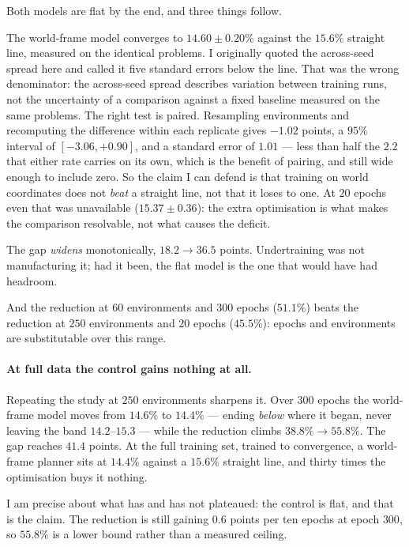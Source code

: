 \documentclass[11pt,a4paper]{article}
\begin{document}
Both models are flat by the end, and three things follow.

The world-frame model converges to $14.60 \pm 0.20\%$ against the $15.6\%$
straight line, measured on the identical problems. I originally quoted the
across-seed spread here and called it five standard errors below the line. That
was the wrong denominator: the across-seed spread describes variation between
training runs, not the uncertainty of a comparison against a fixed baseline
measured on the same problems. The right test is paired. Resampling environments
and recomputing the difference within each replicate gives $-1.02$ points, a
$95\%$ interval of $[-3.06, +0.90]$, and a standard error of $1.01$ --- less than
half the $2.2$ that either rate carries on its own, which is the benefit of
pairing, and still wide enough to include zero. So the claim I can defend is that
training on world coordinates does not \emph{beat} a straight line, not that it
loses to one. At $20$ epochs even that was unavailable ($15.37 \pm 0.36$): the
extra optimisation is what makes the comparison resolvable, not what causes the
deficit.

The gap \emph{widens} monotonically, $18.2 \to 36.5$ points. Undertraining was
not manufacturing it; had it been, the flat model is the one that would have had
headroom.

And the reduction at $60$ environments and $300$ epochs ($51.1\%$) beats the
reduction at $250$ environments and $20$ epochs ($45.5\%$): epochs and
environments are substitutable over this range.

\paragraph{At full data the control gains nothing at all.} Repeating the study
at $250$ environments sharpens it. Over $300$ epochs the world-frame model moves
from $14.6\%$ to $14.4\%$ --- ending \emph{below} where it began, never leaving
the band $14.2$--$15.3$ --- while the reduction climbs $38.8\% \to 55.8\%$. The
gap reaches $\mathbf{41.4}$ points. At the full training set, trained to
convergence, a world-frame planner sits at $14.4\%$ against a $15.6\%$ straight
line, and thirty times the optimisation buys it nothing.

I am precise about what has and has not plateaued: the control is flat, and that
is the claim. The reduction is still gaining $0.6$ points per ten epochs at epoch
$300$, so $55.8\%$ is a lower bound rather than a measured ceiling.
\end{document}
